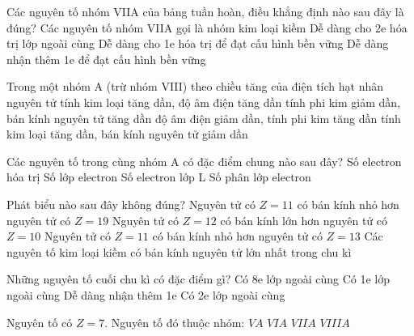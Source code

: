 \documentclass[Main_HOA10.tex]{subfiles}
\begin{document}
\begin{ex}
	Các nguyên tố nhóm VIIA của bảng tuần hoàn, điều khẳng định nào sau đây là đúng?
	\choice
	{Các nguyên tố nhóm VIIA gọi là nhóm kim loại kiềm}
	{Dễ dàng cho 2e hóa trị lớp ngoài cùng}
	{Dễ dàng cho 1e hóa trị để đạt cấu hình bền vững}
	{\True Dễ dàng nhận thêm 1e để đạt cấu hình bền vững}
\end{ex}
\begin{ex}%
	Trong một nhóm A (trừ nhóm VIII) theo chiều tăng của điện tích hạt nhân nguyên tử
	\choice
	{tính kim loại tăng dần, độ âm điện tăng dần}
	{\True tính phi kim giảm dần, bán kính nguyên tử tăng dần}
	{độ âm điện giảm dần, tính phi kim tăng dần}
	{tính kim loại tăng dần, bán kính nguyên tử giảm dần}
\end{ex}
\begin{ex}%
	Các nguyên tố trong cùng nhóm A có đặc điểm chung nào sau đây?
	\choice
	{\True Số electron hóa trị}
	{Số lớp electron}
	{Số electron lớp L}
	{Số phân lớp electron}
\end{ex}
\begin{ex}%
	Phát biểu nào sau đây không đúng?
	\choice
	{Nguyên tử có $Z=11$ có bán kính nhỏ hơn nguyên tử có $Z=19$}
	{Nguyên tử có $Z=12$ có bán kính lớn hơn nguyên tử có $Z=10$}
	{\True Nguyên tử có $Z=11$ có bán kính nhỏ hơn nguyên tử có $Z=13$}
	{Các nguyên tố kim loại kiềm có bán kính nguyên tử lớn nhất trong chu kì}
\end{ex}
\begin{ex}%
	Những nguyên tố cuối chu kì có đặc điểm gì?
	\choice
	{\True Có 8e lớp ngoài cùng}
	{Có 1e lớp ngoài cùng}
	{Dễ dàng nhận thêm 1e}
	{Có 2e lớp ngoài cùng}
\end{ex}
\begin{ex}%
	Nguyên tố có $Z=7$. Nguyên tố đó thuộc nhóm:
	\choice
	{\True $VA$}
	{$VIA$}
	{$VIIA$}
	{$VIIIA$}
\end{ex}
\end{document}

